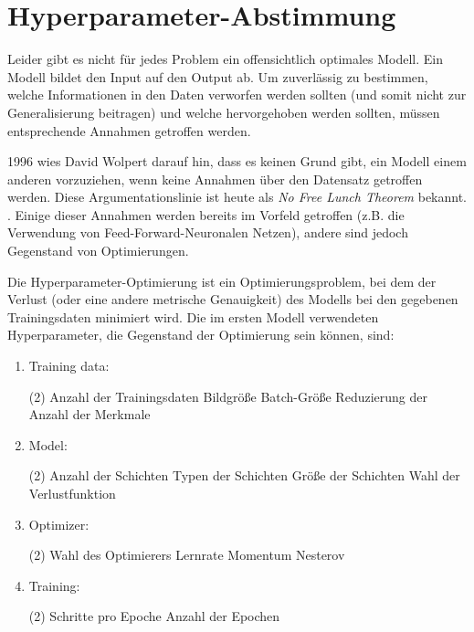 \section{Hyperparameter-Abstimmung} \label{ch:hyper_parameter_tuning}

Leider gibt es nicht für jedes Problem ein offensichtlich optimales Modell.
Ein Modell bildet den Input auf den Output ab.
Um zuverlässig zu bestimmen, welche Informationen in den Daten verworfen werden sollten (und somit nicht zur Generalisierung beitragen) und welche hervorgehoben werden sollten, müssen entsprechende Annahmen getroffen werden.

1996 wies David Wolpert darauf hin, dass es keinen Grund gibt, ein Modell einem anderen vorzuziehen, wenn keine Annahmen über den Datensatz getroffen werden.
Diese Argumentationslinie ist heute als \textit{No Free Lunch Theorem} bekannt. \cite{Wolpert1996}.
Einige dieser Annahmen werden bereits im Vorfeld getroffen (z.B. die Verwendung von Feed-Forward-Neuronalen Netzen), andere sind jedoch Gegenstand von Optimierungen.

Die Hyperparameter-Optimierung ist ein Optimierungsproblem, bei dem der Verlust (oder eine andere metrische Genauigkeit) des Modells bei den gegebenen Trainingsdaten minimiert wird.
Die im ersten Modell verwendeten Hyperparameter, die Gegenstand der Optimierung sein können, sind:

\begin{enumerate}
    \item Training data:
    \begin{tasks}(2)
        \task Anzahl der Trainingsdaten
        \task Bildgröße
        \task Batch-Größe
        \task Reduzierung der Anzahl der Merkmale
    \end{tasks}
    \item Model:
    \begin{tasks}(2)
        \task Anzahl der Schichten
        \task Typen der Schichten
        \task Größe der Schichten
        \task Wahl der Verlustfunktion
    \end{tasks}
    \item Optimizer:
    \begin{tasks}(2)
        \task Wahl des Optimierers
        \task Lernrate
        \task Momentum
        \task Nesterov
    \end{tasks}
    \item Training:
    \begin{tasks}(2)
        \task Schritte pro Epoche
        \task Anzahl der Epochen
    \end{tasks}
\end{enumerate}

